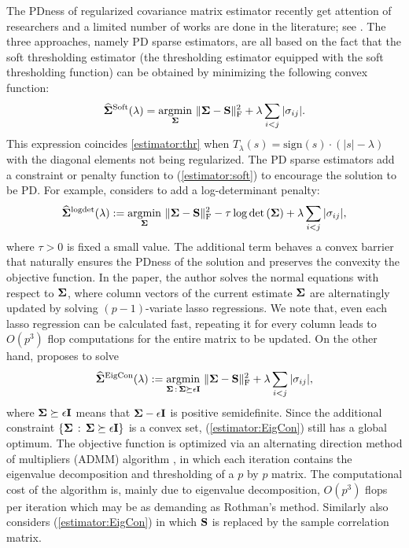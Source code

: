 \documentclass[times,sort&compress,3p]{elsarticle}
\newcommand{\argmin}{\mathop{\rm argmin}}
\newcommand{\sign}{\mathrm{sign}}
\begin{document}
The PDness of regularized covariance matrix estimator recently get attention of researchers and a limited number of works are done in the literature; see \citep{Rothman2012,Xue2012,Liu2014}. The three approaches, namely PD sparse estimators,
 are all based on the fact  that
the soft thresholding estimator (the thresholding estimator equipped with the soft thresholding function) can be obtained by minimizing the following convex
function:
%
\begin{equation}\label{estimator:soft}
\widehat{\bf \Sigma}^{\rm Soft}({\lambda})  = \argmin_{{\bf \Sigma}} \,
	\|{\bf \Sigma} - {\bf S}\|_{\rm F}^2 + \lambda \sum_{i < j} |\sigma_{ij}|
	.
\end{equation}
This expression coincides \eqref{estimator:thr} when $T_{\lambda}(s) = \sign(s) \cdot (|s|-\lambda)$ with the diagonal elements not being regularized.
%
The PD sparse estimators add a constraint or penalty function to (\ref{estimator:soft}) to encourage the solution to be PD. For example, \citet{Rothman2012} considers to add a log-determinant penalty:
\begin{equation}\label{estimator:logdet}
\widehat{\bf \Sigma}^{\rm logdet}(\lambda) := \argmin_{\bf \Sigma} \,
	\|{\bf \Sigma} - {\bf S}\|_{\rm F}^2 - \tau \log \det \left( {\bf \Sigma} \right) + \lambda \sum_{i < j} |\sigma_{ij}|,
\end{equation}
where $\tau > 0$ is fixed a small value.
The additional term behaves a convex barrier that naturally ensures the PDness of the
solution and preserves the convexity the objective function. In the paper, the author solves the normal equations
with respect to ${\bf \Sigma}$, where column vectors of the current estimate ${\bf \Sigma}$ are alternatingly updated by solving $(p-1)$-variate lasso regressions. We note that, even each lasso regression
can be calculated fast, repeating it for every column leads to $O(p^3)$ flop computations for the entire matrix to be updated.
On the other hand, \citet{Xue2012} proposes to solve
\begin{equation}\label{estimator:EigCon}
\widehat{\bf \Sigma}^{\rm EigCon}(\lambda) := \argmin_{{\bf \Sigma} \,:\, {\bf \Sigma} \succeq \epsilon{\bf I}} \,
	\|{\bf \Sigma} - {\bf S}\|_{\rm F}^2 + \lambda \sum_{i < j} |\sigma_{ij}|,
\end{equation}
where ${\bf \Sigma} \succeq \epsilon{\bf I}$ means that ${\bf \Sigma} - \epsilon{\bf I}$ is positive semidefinite.
Since the additional constraint $\{ {\bf \Sigma} \,:\, {\bf \Sigma} \succeq \epsilon{\bf I} \}$ is a convex set, (\ref{estimator:EigCon}) still has a global optimum.
The objective function is optimized via an alternating direction method of multipliers (ADMM) algorithm \citep{Boyd2010}, in which each iteration contains the eigenvalue decomposition and thresholding of a $p$ by $p$ matrix. The computational cost of the algorithm is, mainly due to eigenvalue decomposition, $O(p^3)$ flops per iteration which may be as demanding as Rothman's method. Similarly \citet  {Liu2014} also considers (\ref{estimator:EigCon}) in which ${\bf S}$ is replaced by the sample correlation matrix.
\end{document}
